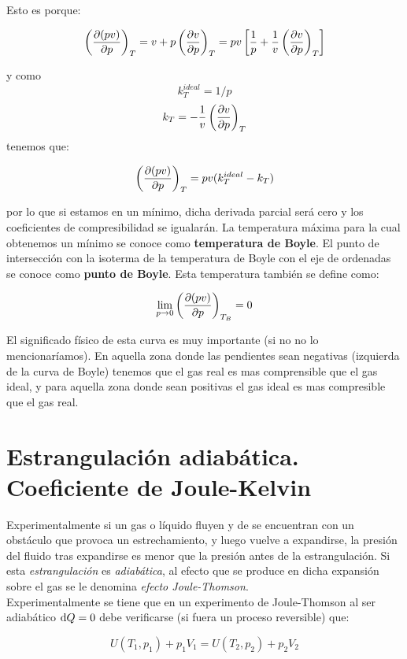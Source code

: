 \documentclass[12pt]{book}
\begin{document}
Esto es porque:

$$ \left( \frac{\partial (pv)}{\partial p} \right)_T  = v + p \left( \frac{\partial v}{\partial p} \right)_T = pv \left[ \dfrac{1}{p} + \dfrac{1}{v} \left( \frac{\partial v}{\partial p} \right)_T \right] $$

y como $$k_T^{ideal}=1/p$$ $$k_T = - \frac{1}{v} \left( \frac{\partial v}{\partial p} \right)_T$$ tenemos que:

\begin{equation}
\left( \frac{\partial (pv)}{\partial p} \right)_T   = pv(k_T^{ideal} - k_T)
\end{equation}

por lo que si estamos en un mínimo, dicha derivada parcial será cero y los coeficientes de compresibilidad se igualarán. La temperatura máxima para la cual obtenemos un mínimo se conoce como \textbf{temperatura de Boyle}. El punto de intersección con la isoterma de la temperatura de Boyle con el eje de ordenadas se conoce como \textbf{punto de Boyle}. Esta temperatura también se define como:

\begin{equation}
\lim_{p \rightarrow 0} \left( \frac{\partial (pv)}{\partial p} \right)_{T_B} = 0
\end{equation}

El significado físico de esta curva es muy importante (si no no lo mencionaríamos). En aquella zona donde las pendientes sean negativas (izquierda de la curva de Boyle) tenemos que el gas real es mas comprensible que el gas ideal, y para aquella zona donde sean positivas el gas ideal es mas compresible que el gas real.

\section{Estrangulación adiabática. Coeficiente de Joule-Kelvin}

Experimentalmente si un gas o líquido fluyen y de se encuentran con un obstáculo que provoca un estrechamiento, y luego vuelve a expandirse, la presión del fluido tras expandirse es menor que la presión antes de la estrangulación. Si esta \textit{estrangulación} es \textit{adiabática}, al efecto que se produce en dicha expansión sobre el gas se le denomina \textit{efecto Joule-Thomson}. \\

Experimentalmente se tiene que en un experimento de Joule-Thomson al ser adiabático $\mathrm{d} Q=0$ debe verificarse (si fuera un proceso reversible) que:

\begin{equation}
U(T_1,p_1) + p_1 V_1 = U(T_2,p_2) + p_2 V_2
\end{equation}
\end{document}
